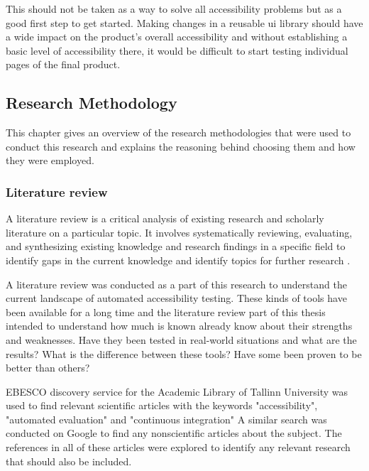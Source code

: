 \documentclass{master_thesis}
\begin{document}
This should not be taken as a way to solve all accessibility problems but as a good first step to get started. Making changes in a reusable \ac{ui} library should have a wide impact on the product's overall accessibility and without establishing a basic level of accessibility there, it would be difficult to start testing individual pages of the final product.

\subsection{Research Methodology}


This chapter gives an overview of the research methodologies that were used to conduct this research and explains the reasoning behind choosing them and how they were employed.

\subsubsection{Literature review}

A literature review is a critical analysis of existing research and scholarly literature on a particular topic. It involves systematically reviewing, evaluating, and synthesizing existing knowledge and research findings in a specific field to identify gaps in the current knowledge and identify topics for further research \citep{Luft2022}.

A literature review was conducted as a part of this research to understand the current landscape of automated accessibility testing. These kinds of tools have been available for a long time and the literature review part of this thesis intended to understand how much is known already know about their strengths and weaknesses. Have they been tested in real-world situations and what are the results? What is the difference between these tools? Have some been proven to be better than others?

EBESCO discovery service for the Academic Library of Tallinn University was used to find relevant scientific articles with the keywords "accessibility", "automated evaluation" and "continuous integration" A similar search was conducted on Google to find any nonscientific articles about the subject. The references in all of these articles were explored to identify any relevant research that should also be included.
\end{document}

